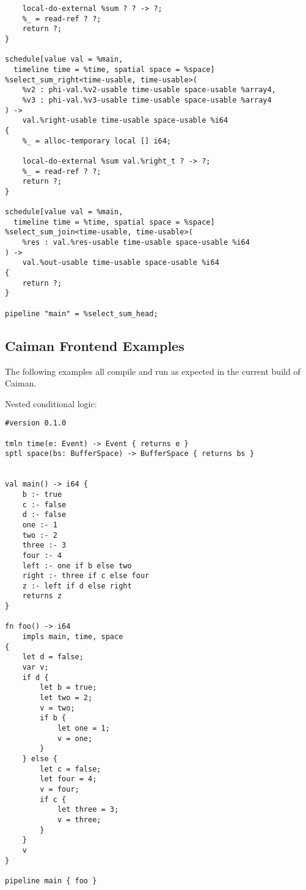 \begin{lstlisting}
    local-do-external %sum ? ? -> ?;
    %_ = read-ref ? ?;
    return ?;
}

schedule[value val = %main, 
  timeline time = %time, spatial space = %space]
%select_sum_right<time-usable, time-usable>(
    %v2 : phi-val.%v2-usable time-usable space-usable %array4,
    %v3 : phi-val.%v3-usable time-usable space-usable %array4
) -> 
    val.%right-usable time-usable space-usable %i64
{
    %_ = alloc-temporary local [] i64;

    local-do-external %sum val.%right_t ? -> ?;
    %_ = read-ref ? ?;
    return ?;
}

schedule[value val = %main, 
  timeline time = %time, spatial space = %space]
%select_sum_join<time-usable, time-usable>(
    %res : val.%res-usable time-usable space-usable %i64
) -> 
    val.%out-usable time-usable space-usable %i64
{
    return ?;
}

pipeline "main" = %select_sum_head;
\end{lstlisting}

\subsection{Caiman Frontend Examples}
\label{subsec:caiman-frontend-examples}

The following examples all compile and run as expected in the current build of Caiman.

Nested conditional logic:

\begin{lstlisting}
#version 0.1.0

tmln time(e: Event) -> Event { returns e }
sptl space(bs: BufferSpace) -> BufferSpace { returns bs }


val main() -> i64 {
    b :- true
    c :- false
    d :- false
    one :- 1
    two :- 2
    three :- 3
    four :- 4
    left :- one if b else two
    right :- three if c else four
    z :- left if d else right
    returns z
}

fn foo() -> i64
    impls main, time, space
{
    let d = false;
    var v;
    if d {
        let b = true;
        let two = 2;
        v = two;
        if b {
            let one = 1;
            v = one;
        }
    } else {
        let c = false;
        let four = 4;
        v = four;
        if c {
            let three = 3;
            v = three;
        }
    }
    v
}

pipeline main { foo }
\end{lstlisting}

